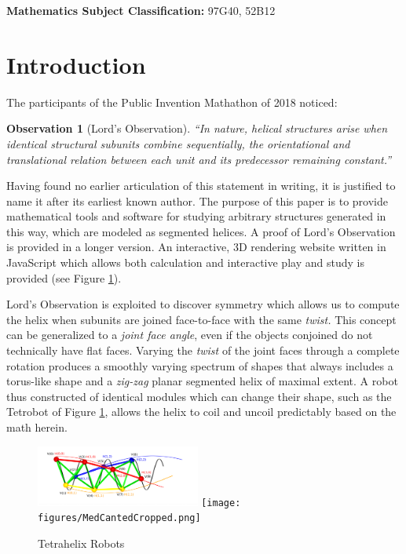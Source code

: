 \documentclass{svproc}
\newtheorem{observation}{Observation}
\begin{document}


\makeatletter
\newcommand{\subjclass}[1]{%
    \small
    \textbf{Mathematics Subject Classification:} #1}


\makeatother

\subjclass{ 97G40, 52B12}

\section{Introduction}

The participants of the Public Invention Mathathon of 2018\cite{read2019mathathon} noticed:
\begin{observation}[Lord's Observation]
  “In nature, helical structures arise when identical structural subunits combine sequentially, the orientational and translational relation between each unit and its predecessor remaining constant.”\cite{lord2002helical}
  \label{obs:lords}
\end{observation}
Having found no earlier articulation of this statement
in writing, it is justified to name it after its earliest known author.
The purpose of this paper is to provide mathematical
tools and software for studying arbitrary
structures generated in this way, which are modeled as segmented helices.
A proof of Lord's Observation is provided in a longer version\cite{readfullsegmentedhelix}.
An interactive, 3D rendering website written in JavaScript which allows both calculation and
interactive play and study is provided\cite{segmentedhelixinteractive}
(see Figure \ref{fig:tetrahelices}).

Lord's Observation is exploited to discover symmetry which allows us to compute the helix when subunits are joined face-to-face with
the same {\em twist.}
This concept can be generalized to a {\em joint face angle}, even if the
objects conjoined do not technically have flat faces.
Varying the {\em twist} of the joint faces through a complete rotation produces a smoothly varying
spectrum of shapes that always includes a torus-like shape and a
{\em zig-zag} planar segmented helix of maximal extent.
A robot thus constructed of identical modules which can change their shape, such as the Tetrobot of Figure \ref{fig:tetrahelices}, allows the helix to coil and uncoil
predictably based on the math herein.

\begin{figure}
  \centering

{\includegraphics[width=0.48\textwidth]{figures/UnifiedDrawing.png}}
{\texttt{[image: figures/MedCantedCropped.png]}}
\caption{Tetrahelix Robots}\label{fig:tetrahelices}
\end{figure}
\end{document}
